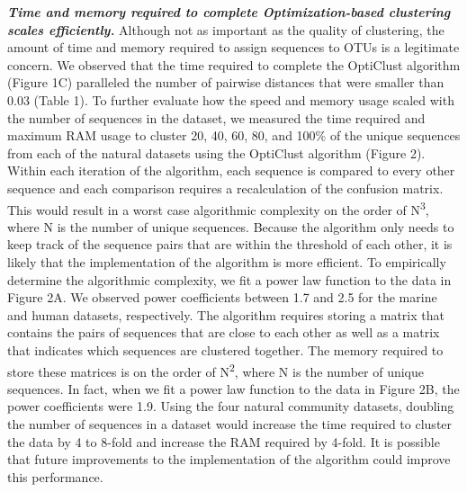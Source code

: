 \documentclass[11pt,]{article}
\begin{document}
\textbf{\emph{Time and memory required to complete Optimization-based
clustering scales efficiently.}} Although not as important as the
quality of clustering, the amount of time and memory required to assign
sequences to OTUs is a legitimate concern. We observed that the time
required to complete the OptiClust algorithm (Figure 1C) paralleled the
number of pairwise distances that were smaller than 0.03 (Table 1). To
further evaluate how the speed and memory usage scaled with the number
of sequences in the dataset, we measured the time required and maximum
RAM usage to cluster 20, 40, 60, 80, and 100\% of the unique sequences
from each of the natural datasets using the OptiClust algorithm (Figure
2). Within each iteration of the algorithm, each sequence is compared to
every other sequence and each comparison requires a recalculation of the
confusion matrix. This would result in a worst case algorithmic
complexity on the order of N\textsuperscript{3}, where N is the number
of unique sequences. Because the algorithm only needs to keep track of
the sequence pairs that are within the threshold of each other, it is
likely that the implementation of the algorithm is more efficient. To
empirically determine the algorithmic complexity, we fit a power law
function to the data in Figure 2A. We observed power coefficients
between 1.7 and 2.5 for the marine and human datasets, respectively. The
algorithm requires storing a matrix that contains the pairs of sequences
that are close to each other as well as a matrix that indicates which
sequences are clustered together. The memory required to store these
matrices is on the order of N\textsuperscript{2}, where N is the number
of unique sequences. In fact, when we fit a power law function to the
data in Figure 2B, the power coefficients were 1.9. Using the four
natural community datasets, doubling the number of sequences in a
dataset would increase the time required to cluster the data by 4 to
8-fold and increase the RAM required by 4-fold. It is possible that
future improvements to the implementation of the algorithm could improve
this performance.
\end{document}
